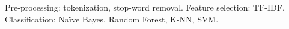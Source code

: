 Pre-processing: tokenization, stop-word removal. Feature selection: TF-IDF. Classification: Naïve Bayes, Random Forest, K-NN, SVM.